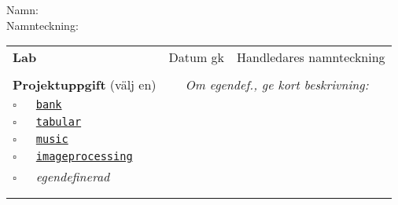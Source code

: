 \vspace{2.5em}\noindent Namn: \dotfill\\

\vspace{1em}\noindent Namnteckning: \dotfill\\

\newcommand{\LabRow}[1]{\\[-1.1em] \hyperref[section:lab:#1]{\texttt{#1}} & \dotfill &  \dotfill  \\ \addlinespace }

\begin{table}[h]
\centering
\vspace{1em}
\begin{tabular}{lcc}
\toprule \addlinespace
{\sffamily\bfseries\small Lab} & {\sffamily\small Datum gk} &	{\sffamily\small Handledares namnteckning}\\ \addlinespace \midrule \\[-0.5em]

\addlinespace \midrule \addlinespace
{\sffamily\small {\bfseries Projektuppgift} (välj en)	} &
\multicolumn{2}{c}{\textit{Om egendef., ge kort beskrivning:}}  \\
\addlinespace\addlinespace %
{\Large$\square$}\texttt{~~~\hyperref[section:proj:bank]{bank}}  &  &  \\ \addlinespace
{\Large$\square$}\texttt{~~~\hyperref[section:proj:tabular]{tabular}} \\ \addlinespace
{\Large$\square$}\texttt{~~~\hyperref[section:proj:music]{music}} \\ \addlinespace
{\Large$\square$}\texttt{~~~\hyperref[section:proj:imageprocessing]{imageprocessing}}  \\ \addlinespace
{\Large$\square$}\texttt{~~~}\textit{egendefinerad}  \\
\\
\\
\bottomrule
\end{tabular}
\end{table}
